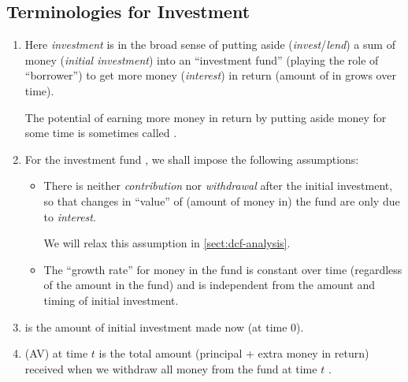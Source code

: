 \subsection{Terminologies for Investment}
\begin{enumerate}
\item Here \emph{investment} is in the broad sense of putting aside
(\emph{invest}/\emph{lend}) a sum of money  (\emph{initial
investment}) into an ``investment fund''  (playing the role
of ``borrower'') to get more money  (\emph{interest}) in
return (amount of  in  grows over time).

\begin{note}
The potential of earning more money in return by putting aside money for some
time is sometimes called .
\end{note}

\item For the investment fund , we shall impose the following assumptions:
\begin{itemize}
\item There is neither \emph{contribution} nor \emph{withdrawal} after the
initial investment, so that changes in ``value'' of (amount of money in) the
fund  are only due to \emph{interest}. \begin{note}
We will relax this assumption in \cref{sect:dcf-analysis}.
\end{note}
\item The ``growth rate'' for money in the fund  is constant
over time (regardless of the amount in the fund) and is independent from the
amount and timing of initial investment.
\end{itemize}

\item {} is the amount of initial investment made now (at time 0).
\item {} (AV) at time \(t\) is the total amount
(principal + extra money in return) received when we withdraw all money from
the fund  at time \(t\) .



\end{enumerate}
